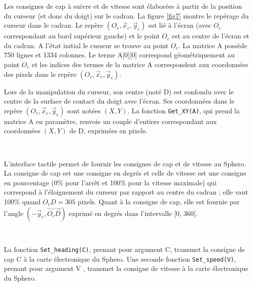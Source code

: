 Les consignes de cap à suivre et de vitesse sont élaborées à partir de la position du curseur (et donc du doigt) sur le cadran. La figure \ref{fig7} montre le repérage du curseur dans le cadran. Le repère $(O_e,\overrightarrow{x}_e,\overrightarrow{y}_e)$ est lié à l'écran (avec $O_e$ correspondant au bord supérieur gauche) et le point $O_c$ est au centre de l'écran et du cadran. A l'état initial le curseur se trouve au point $O_c$. La matrice A possède 750 lignes et 1334 colonnes. Le terme A[0][0] correspond géométriquement au point $O_e$ et les indices des termes de la matrice A correspondent aux coordonnées des pixels dans le repère $(O_e,\overrightarrow{x}_e,\overrightarrow{y}_e)$. 

Lors de la manipulation du curseur, son centre (noté D) est confondu avec le centre de la surface de contact du doigt avec l'écran. Ses coordonnées dans le repère $(O_c,\overrightarrow{x}_e,\overrightarrow{y}_e)$ sont notées $(X,Y)$. La fonction \verb?Get_XY(A)?, qui prend la matrice A en paramètre, renvoie un couple d'entiers correspondant aux coordonnées $(X,Y)$ de D, exprimées en pixels. 


~\

L'interface tactile permet de fournir les consignes de cap et de vitesse au Sphero. La consigne de cap est une consigne en degrés et celle de vitesse est une consigne en pourcentage (0\% pour l'arrêt et 100\% pour la vitesse maximale) qui correspond à l'éloignement du curseur par rapport au centre du cadran ; elle vaut 100\% quand $O_cD = 305$ pixels. Quant à la consigne de cap, elle est fournie par l'angle $(-\overrightarrow{y}_e,\overrightarrow{O_cD})$ exprimé en degrés dans l'intervalle [0, 360[. 


~\

La fonction \verb?Set_heading(C)?, prenant pour argument C, transmet la consigne de cap C à la carte électronique du Sphero. Une seconde fonction \verb?Set_speed(V)?, prenant pour argument V , transmet la consigne de vitesse à la carte électronique du Sphero. 

